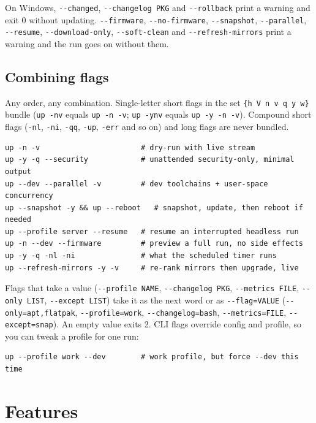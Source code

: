 \documentclass[11pt,a4paper]{article}
\begin{document}
On Windows, \texttt{-{}-changed}, \texttt{-{}-changelog PKG} and
\texttt{-{}-rollback} print a warning and exit 0 without updating.
\texttt{-{}-firmware}, \texttt{-{}-no-firmware}, \texttt{-{}-snapshot},
\texttt{-{}-parallel}, \texttt{-{}-resume}, \texttt{-{}-download-only},
\texttt{-{}-soft-clean} and \texttt{-{}-refresh-mirrors} print a warning
and the run goes on without them.

\subsection{Combining flags}
Any order, any combination. Single-letter short flags in the set \texttt{\{h V n v q y w\}} bundle
(\texttt{up -nv} equals \texttt{up -n -v}; \texttt{up -ynv} equals
\texttt{up -y -n -v}). Compound short flags (\texttt{-nl}, \texttt{-ni},
\texttt{-qq}, \texttt{-up}, \texttt{-err} and so on) and long flags are
never bundled.

\begin{lstlisting}[language=bashplus]
up -n -v                       # dry-run with live stream
up -y -q --security            # unattended security-only, minimal output
up --dev --parallel -v         # dev toolchains + user-space concurrency
up --snapshot -y && up --reboot   # snapshot, update, then reboot if needed
up --profile server --resume   # resume an interrupted headless run
up -n --dev --firmware         # preview a full run, no side effects
up -y -q -nl -ni               # what the scheduled timer runs
up --refresh-mirrors -y -v     # re-rank mirrors then upgrade, live
\end{lstlisting}

Flags that take a value (\texttt{-{}-profile NAME}, \texttt{-{}-changelog PKG},
\texttt{-{}-metrics FILE}, \texttt{-{}-only LIST},
\texttt{-{}-except LIST}) take it as the next word or as
\texttt{-{}-flag=VALUE} (\texttt{-{}-only=apt,flatpak}, \texttt{-{}-profile=work},
\texttt{-{}-changelog=bash}, \texttt{-{}-metrics=FILE}, \texttt{-{}-except=snap}).
An empty value exits 2. CLI flags
override config and profile, so you can tweak a profile for one run:

\begin{lstlisting}[language=bashplus]
up --profile work --dev        # work profile, but force --dev this time
\end{lstlisting}

\section{Features}\label{sec:features}
\end{document}
